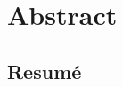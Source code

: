 \documentclass[../main]{subfiles}
\begin{document}
\section*{Abstract}
\lipsum[1-4]


\begin{otherlanguage}{danish}
\section*{Resumé}
\lipsum[1-4]
\end{otherlanguage}
\end{document}
